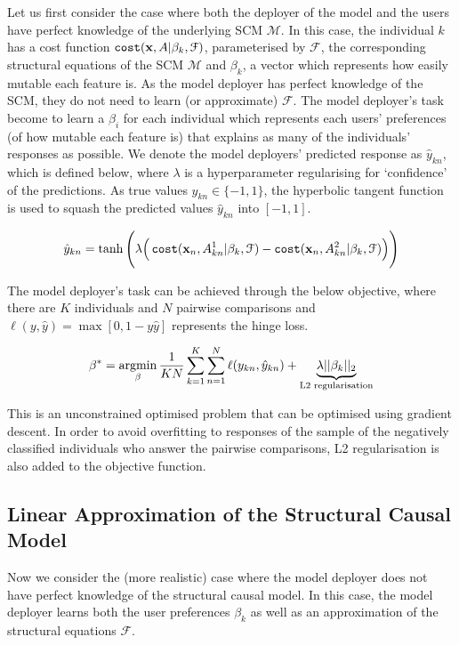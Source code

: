 Let us first consider the case where both the deployer of the model and the users have perfect knowledge of the underlying SCM $\mathcal{M}$. In this case, the individual $k$ has a cost function $\operatorname*{\texttt{cost}}(\mathbf{x}, A|\beta_k, \mathcal{F})$, parameterised by $\mathcal{F}$, the corresponding structural equations of the SCM $\mathcal{M}$ and $\beta_k$, a vector which represents how easily mutable each feature is. As the model deployer has perfect knowledge of the SCM, they do not need to learn (or approximate) $\mathcal{F}$. The model deployer's task become to learn a $\beta_i$ for each individual which represents each users' preferences (of how mutable each feature is) that explains as many of the individuals' responses as possible. We denote the model deployers' predicted response as $\hat{y}_{kn}$, which is defined below, where $\lambda$ is a hyperparameter regularising for `confidence' of the predictions. As true values $y_{kn} \in \{-1,1\}$, the hyperbolic tangent function is used to squash the predicted values $\hat{y}_{kn}$ into $[-1,1]$.

\begin{equation} \label{eq:yhat_relaxation}
	\hat{y}_{kn} = \tanh \Bigg(\lambda \Big(\operatorname*{\texttt{cost}}(\mathbf{x}_n, A^1_{kn}|\beta_k, \mathcal{F}) - \operatorname*{\texttt{cost}}(\mathbf{x}_n, A^2_{kn}|\beta_k, \mathcal{F})\Big)\Bigg)
\end{equation}

The model deployer's task can be achieved through the below objective, where there are $K$ individuals and $N$ pairwise comparisons and $\ell(y, \hat{y}) = \max[0, 1-y\hat{y}]$ represents the hinge loss.

\begin{equation}
	\beta^* = \operatorname*{argmin}_\beta \frac{1}{KN} \sum_{k=1}^K \sum_{n=1}^N \ell (y_{kn}, \hat{y}_{kn}) + \underbrace{\lambda ||\beta_k||_2}_{\text{L2 regularisation}}
\end{equation}

This is an unconstrained optimised problem that can be optimised using gradient descent. In order to avoid overfitting to responses of the sample of the negatively classified individuals who answer the pairwise comparisons, L2 regularisation is also added to the objective function.

\subsection{Linear Approximation of the Structural Causal Model}

Now we consider the (more realistic) case where the model deployer does not have perfect knowledge of the structural causal model. In this case, the model deployer learns both the user preferences $\beta_k$ as well as an approximation of the structural equations $\mathcal{F}$.\\


